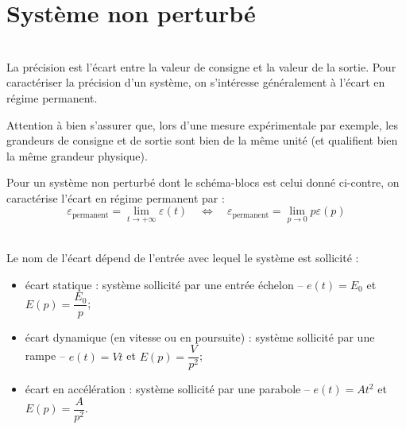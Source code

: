 \documentclass[10pt,fleqn]{article} %
\begin{document}

\setlength{\columnseprule}{.1pt}

\vspace{2cm}
\pagestyle{fancy}
\thispagestyle{plain}
\section{Système non perturbé}
\begin{defi}~\\


La précision est l'écart entre la valeur de consigne et la valeur de la sortie. Pour caractériser la précision d'un système, on s'intéresse généralement à l'écart en régime permanent.

Attention à bien s'assurer que, lors d'une mesure expérimentale par exemple, les grandeurs de consigne et de sortie sont bien de la même unité (et qualifient bien la même grandeur physique).

\vspace{.2cm}

\noindent \begin{minipage}[c]{.6\linewidth}
Pour un système non perturbé dont le schéma-blocs est celui donné ci-contre, on caractérise l'écart en régime permanent par :
$$
\varepsilon_{\text{permanent}}=\lim\limits_{t\to +\infty} \varepsilon(t)
\quad
\Longleftrightarrow 
\quad
\varepsilon_{\text{permanent}}=\lim\limits_{p\to 0} p\varepsilon(p)
$$
\end{minipage}
\hspace{.5cm}
\begin{minipage}[c]{.25\linewidth}

\end{minipage}

\end{defi}



\begin{defi} \~\\
Le nom de l'écart dépend de l'entrée avec lequel le système est sollicité : 
\begin{itemize}
\item écart statique : système sollicité par une entrée échelon -- $e(t)=E_0$ et $E(p)=\dfrac{E_0}{p}$;
\item écart dynamique (en vitesse ou en poursuite) : système sollicité par une rampe -- $e(t)=Vt$ et $E(p)=\dfrac{V}{p^2}$;
\item écart en accélération : système sollicité par une parabole  -- $e(t)=At^2$ et $E(p)=\dfrac{A}{p^2}$.
\end{itemize}
\end{defi}
\end{document}
